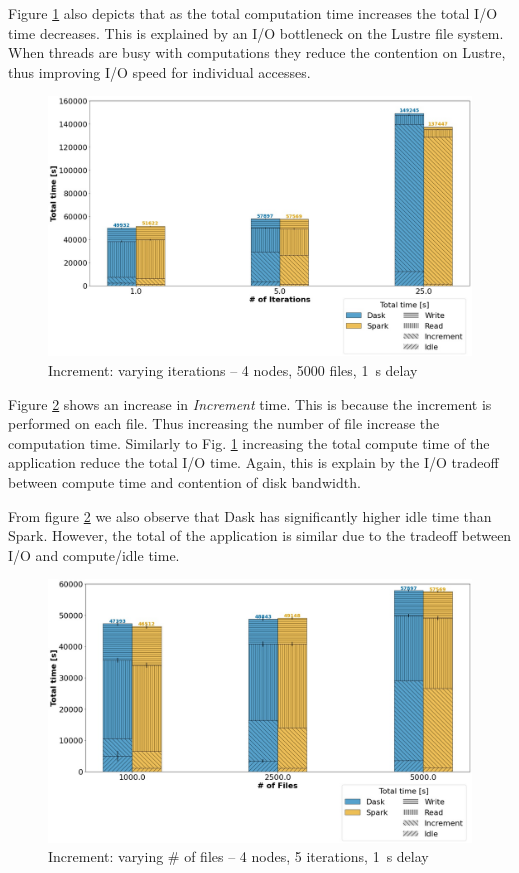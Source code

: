 \documentclass[conference]{IEEEtran}
\begin{document}
Figure \ref{fig:increment_itr} also depicts that as the total computation time increases the total I/O time decreases.
This is explained by an I/O bottleneck on the Lustre file system.
When threads are busy with computations they reduce the contention on Lustre, thus improving I/O speed for individual accesses.
\begin{figure}[!h]
	\centering
	\includegraphics[clip,width=\columnwidth]{figures/stacked_increment_itr.jpg}
	\caption{Increment: varying iterations -- 4 nodes, 5000 files, \SI{1}{\second} delay}
	\label{fig:increment_itr}
\end{figure}

Figure \ref{fig:increment_block} shows an increase in \textit{Increment} time.
This is because the increment is performed on each file.
Thus increasing the number of file increase the computation time.
Similarly to Fig. \ref{fig:increment_itr} increasing the total compute time of the application reduce the total I/O time.
Again, this is explain by the I/O tradeoff between compute time and contention of disk bandwidth.

From figure \ref{fig:increment_block} we also observe that Dask has significantly higher idle time than Spark.
However, the total of the application is similar due to the tradeoff between I/O and compute/idle time.

\begin{figure}[!h]
	\centering
	\includegraphics[clip,width=\columnwidth]{figures/stacked_increment_block.jpg}
	\caption{Increment: varying \# of files -- 4 nodes, 5 iterations, \SI{1}{\second} delay}
	\label{fig:increment_block}
\end{figure}
\end{document}

